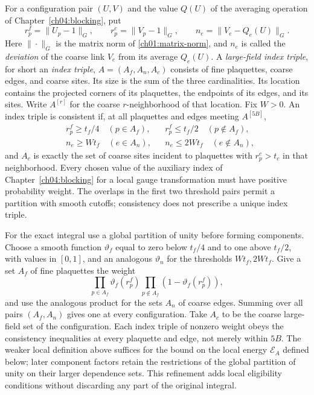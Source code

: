 For a configuration pair $(U,V)$ and the value $Q(U)$ of the averaging operation of
Chapter~\ref{ch04:blocking}, put
\[
 r_p^f=\|U_p-1\|_G,\qquad r_p^c=\|V_p-1\|_G,\qquad
 n_e=\|V_e-Q_e(U)\|_G.
\]
Here $\|\cdot\|_G$ is the matrix norm of \eqref{ch01:matrix-norm}, and $n_e$ is called the \emph{deviation} of the coarse link $V_e$ from its average $Q_e(U)$. A \emph{large-field index triple}, for short an \emph{index triple},
$A=(A_f,A_n,A_c)$ consists of fine plaquettes, coarse edges, and
coarse sites. Its size is the sum of the three cardinalities. Its location
contains the projected corners of its plaquettes, the endpoints of its
edges, and its sites. Write $A^{[r]}$ for the coarse $r$-neighborhood of
that location. Fix $W>0$. An index triple is consistent if, at all plaquettes and edges meeting
$A^{[5B]}$,
\begin{align*}
 &r_p^f\ge t_f/4\quad(p\in A_f),&
 &r_p^f\le t_f/2\quad(p\notin A_f),\\
 &n_e\ge Wt_f\quad(e\in A_n),&
 &n_e\le2Wt_f\quad(e\notin A_n),
\end{align*}
and $A_c$ is exactly the set of coarse sites incident to plaquettes with
$r_p^c>t_c$ in that neighborhood. Every chosen value of the auxiliary index of Chapter~\ref{ch04:blocking} for a local gauge transformation must have positive
probability weight. The overlaps in the first two threshold pairs permit a partition
with smooth cutoffs; consistency does not prescribe a unique index triple.

For the exact integral use a global partition of unity before forming components.
Choose a smooth function $\vartheta_f$ equal to zero below $t_f/4$
and to one above $t_f/2$, with values in $[0,1]$, and an analogous
$\vartheta_n$ for the thresholds $Wt_f,2Wt_f$. Give a set $A_f$ of fine plaquettes
the weight
\[
 \prod_{p\in A_f}\vartheta_f(r_p^f)
 \prod_{p\notin A_f}(1-\vartheta_f(r_p^f)),
\]
and use the analogous product for the sets $A_n$ of coarse edges. Summing over all
pairs $(A_f,A_n)$ gives one at every configuration. Take $A_c$ to be the
coarse large-field set of the configuration. Each index triple of nonzero weight obeys
the consistency inequalities at every plaquette and edge, not merely within $5B$.
The weaker local definition above suffices for the bound on the local energy $\mathcal E_A$ defined below;
later component factors retain the restrictions of the global partition of unity
on their larger dependence sets. This refinement adds local
eligibility conditions without discarding any part of the original integral.

